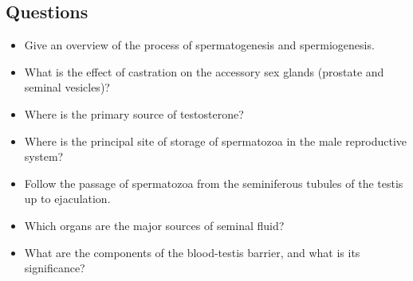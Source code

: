 \subsection{Questions}
\begin{itemize}\color{minor}
  \item Give an overview of the process of spermatogenesis and spermiogenesis.
  \basec{\begin{itemize}
    \item 
  \end{itemize}}

  \item What is the effect of castration on the accessory sex glands (prostate and seminal vesicles)?
  \basec{\begin{itemize}
    \item 
  \end{itemize}}

  \item Where is the primary source of testosterone?
  \basec{\begin{itemize}
    \item 
  \end{itemize}}

  \item Where is the principal site of storage of spermatozoa in the male reproductive system?
  \basec{\begin{itemize}
    \item 
  \end{itemize}}

  \item Follow the passage of spermatozoa from the seminiferous tubules of the testis up to ejaculation.
  \basec{\begin{itemize}
    \item 
  \end{itemize}}

  \item Which organs are the major sources of seminal fluid?
  \basec{\begin{itemize}
    \item 
  \end{itemize}}

  \item What are the components of the blood-testis barrier, and what is its significance?
  \basec{\begin{itemize}
    \item 
  \end{itemize}}
\end{itemize}

